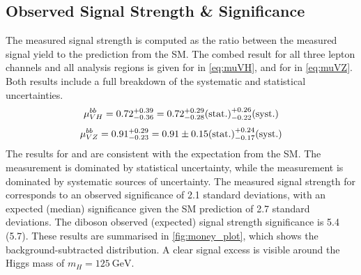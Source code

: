 \subsection{Observed Signal Strength \& Significance}\label{sec:signal_strengh_sigs}

The measured signal strength is computed as the ratio between the measured signal yield to the prediction from the SM.
The combed result for all three lepton channels and all analysis regions is given for \muVH in \cref{eq:muVH}, and for \muVZ in \cref{eq:muVZ}.
Both results include a full breakdown of the systematic and   statistical uncertainties.
%
\begin{equation}\label{eq:muVH}
  \mu_{VH}^{bb} = 0.72 ^{+0.39}_{-0.36} = 0.72 ^{+0.29}_{-0.28}  \mathrm{(stat.)} ^{+0.26}_{-0.22} \mathrm{(syst.)}
\end{equation}
%
\begin{equation}\label{eq:muVZ}
  \mu_{VZ}^{bb} = 0.91 ^{+0.29}_{-0.23} = 0.91 \pm 0.15 \mathrm{(stat.)} ^{+0.24}_{-0.17} \mathrm{(syst.)} 
\end{equation}
%
The results for \muVH and \muVZ are consistent with the expectation from the SM.
The \muVH measurement is dominated by statistical uncertainty, while the \muVZ measurement is dominated by systematic sources of uncertainty.
The measured signal strength for \muVZ corresponds to an observed significance of 2.1 standard deviations, with an expected (median) significance given the SM prediction of 2.7 standard deviations.
The diboson observed (expected) signal strength significance is 5.4 (5.7).
These results are summarised in \cref{fig:money_plot}, which shows the background-subtracted \mJ distribution.
A clear signal excess is visible around the Higgs mass of $m_H = \SI{125}{\GeV}$.

